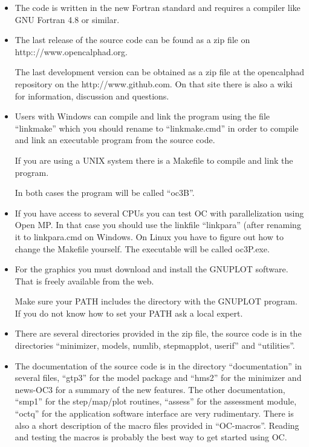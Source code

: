 \documentclass[12pt]{article}
\begin{document}
\begin{itemize}
\item The code is written in the new Fortran standard and requires a
  compiler like GNU Fortran 4.8 or similar.

\item The last release of the source code can be found as a zip file
  on http:://www.opencalphad.org.

  The last development version can be obtained as a zip file at the
  opencalphad repository on the http://www.github.com.  On that site
  there is also a wiki for information, discussion and questions.

\item Users with Windows can compile and link the program using the
  file ``linkmake'' which you should rename to ``linkmake.cmd'' in
  order to compile and link an executable program from the source
  code.

  If you are using a UNIX system there is a Makefile to compile and link
  the program.

  In both cases the program will be called ``oc3B''.

\item If you have access to several CPUs you can test OC with
  parallelization using Open MP.  In that case you should use the
  linkfile ``linkpara'' (after renaming it to linkpara.cmd on
  Windows.  On Linux you have to figure out how to change the Makefile
  yourself.  The executable will be called oc3P.exe.

\item For the graphics you must download and install the GNUPLOT
  software.  That is freely available from the web.

  Make sure your PATH includes the directory with the GNUPLOT program.
  If you do not know how to set your PATH ask a local expert.

\item There are several directories provided in the zip file, the
  source code is in the directories ``minimizer, models, numlib,
  stepmapplot, userif'' and ``utilities''.

\item The documentation of the source code is in the directory
  ``documentation'' in several files, ``gtp3'' for the model package
  and ``hms2'' for the minimizer and news-OC3 for a summary of the new
  features.  The other documentation, ``smp1'' for the step/map/plot
  routines, ``assess'' for the assessment module, ``octq'' for the
  application software interface are very rudimentary.  There is also
  a short description of the macro files provided in ``OC-macros''.
  Reading and testing the macros is probably the best way to get
  started using OC.


\end{itemize}
\end{document}
